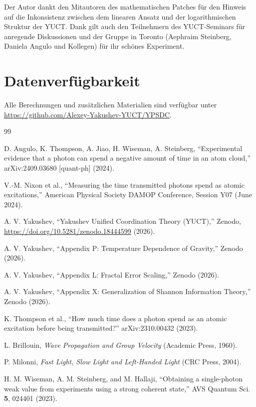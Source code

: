 \documentclass[12pt,a4paper]{article}
\begin{document}
	Der Autor dankt den Mitautoren des mathematischen Patches für den Hinweis auf die Inkonsistenz zwischen dem linearen Ansatz und der logarithmischen Struktur der YUCT. Dank gilt auch den Teilnehmern des YUCT-Seminars für anregende Diskussionen und der Gruppe in Toronto (Aephraim Steinberg, Daniela Angulo und Kollegen) für ihr schönes Experiment.
	
	\section*{Datenverfügbarkeit}
	
	Alle Berechnungen und zusätzlichen Materialien sind verfügbar unter \url{https://github.com/Alexey-Yakushev-YUCT/YPSDC}.
	
	\begin{thebibliography}{99}
		
		D. Angulo, K. Thompson, A. Jiao, H. Wiseman, A. Steinberg, ``Experimental evidence that a photon can spend a negative amount of time in an atom cloud,'' arXiv:2409.03680 [quant-ph] (2024).
		
		V.-M. Nixon et al., ``Measuring the time transmitted photons spend as atomic excitations,'' American Physical Society DAMOP Conference, Session Y07 (June 2024).
		
		A. V. Yakushev, ``Yakushev Unified Coordination Theory (YUCT),'' Zenodo, \url{https://doi.org/10.5281/zenodo.18444599} (2026).
		
		A. V. Yakushev, ``Appendix P: Temperature Dependence of Gravity,'' Zenodo (2026).
		
		A. V. Yakushev, ``Appendix L: Fractal Error Scaling,'' Zenodo (2026).
		
		A. V. Yakushev, ``Appendix X: Generalization of Shannon Information Theory,'' Zenodo (2026).
		
		K. Thompson et al., ``How much time does a photon spend as an atomic excitation before being transmitted?'' arXiv:2310.00432 (2023).
		
		L. Brillouin, \textit{Wave Propagation and Group Velocity} (Academic Press, 1960).
		
		P. Milonni, \textit{Fast Light, Slow Light and Left-Handed Light} (CRC Press, 2004).
		
		H. M. Wiseman, A. M. Steinberg, and M. Hallaji, ``Obtaining a single-photon weak value from experiments using a strong coherent state,'' AVS Quantum Sci. \textbf{5}, 024401 (2023).
		
	\end{thebibliography}
	
\end{document}
